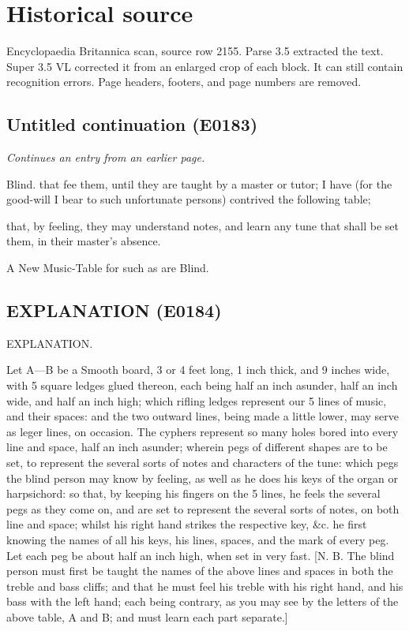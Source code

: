 \documentclass{article}
\begin{document}
\section*{Historical source}
Encyclopaedia Britannica scan, source row 2155. Parse 3.5 extracted the text. Super 3.5 VL corrected it from an enlarged crop of each block. It can still contain recognition errors.
Page headers, footers, and page numbers are removed.

\subsection*{Untitled continuation (E0183)}
\textit{Continues an entry from an earlier page.}

Blind. that fee them, until they are taught by a master or tutor; I have (for the good-will I bear to such unfortunate persons) contrived the following table;

that, by feeling, they may understand notes, and learn any tune that shall be set them, in their master's absence.

A New Music-Table for such as are Blind.

\subsection*{EXPLANATION (E0184)}
EXPLANATION.

Let A—B be a Smooth board, 3 or 4 feet long, 1 inch thick, and 9 inches wide, with 5 square ledges glued thereon, each being half an inch asunder, half an inch wide, and half an inch high; which rifling ledges represent our 5 lines of music, and their spaces: and the two outward lines, being made a little lower, may serve as leger lines, on occasion. The cyphers represent so many holes bored into every line and space, half an inch asunder; wherein pegs of different shapes are to be set, to represent the several sorts of notes and characters of the tune: which pegs the blind person may know by feeling, as well as he does his keys of the organ or harpsichord: so that, by keeping his fingers on the 5 lines, he feels the several pegs as they come on, and are set to represent the several sorts of notes, on both line and space; whilst his right hand strikes the respective key, \&c. he first knowing the names of all his keys, his lines, spaces, and the mark of every peg. Let each peg be about half an inch high, when set in very fast. [N. B. The blind person must first be taught the names of the above lines and spaces in both the treble and bass cliffs; and that he must feel his treble with his right hand, and his bass with the left hand; each being contrary, as you may see by the letters of the above table, A and B; and must learn each part separate.]
\end{document}
